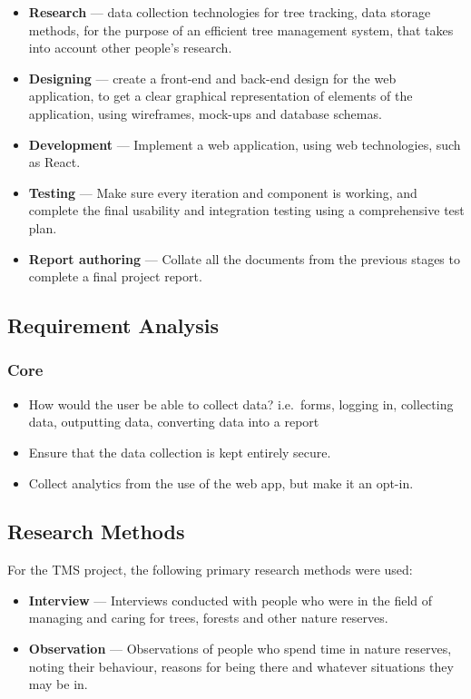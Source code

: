 \documentclass[12pt]{report}
\begin{document}
\begin{itemize}
    \item \textbf{Research} --- data collection technologies for tree tracking,
    data storage methods, for the purpose of an efficient tree management
    system, that takes into account other people's research.
    \item \textbf{Designing} --- create a front-end and back-end design for the
    web application, to get a clear graphical representation of elements of the
    application, using wireframes, mock-ups and database schemas. 
    \item \textbf{Development} --- Implement a web application, using web
    technologies, such as React.
    \item \textbf{Testing} --- Make sure every iteration and component is
    working, and complete the final usability and integration testing using a
    comprehensive test plan.
    \item \textbf{Report authoring} --- Collate all the documents from the
    previous stages to complete a final project report.
\end{itemize}

\subsection{Requirement Analysis}

\subsubsection{Core}

\begin{itemize}
    \item How would the user be able to collect data? i.e.\ forms, logging in,
    collecting data, outputting data, converting data into a report
    \item Ensure that the data collection is kept entirely secure.
    \item Collect analytics from the use of the web app, but make it an opt-in.
\end{itemize}

\subsection{Research Methods}

For the TMS project, the following primary research methods were used:

\begin{itemize}
    \item \textbf{Interview} --- Interviews conducted with people who were
    in the field of managing and caring for trees, forests and other nature
    reserves.
    \item \textbf{Observation} --- Observations of people who spend time in
    nature reserves, noting their behaviour, reasons for being there and
    whatever situations they may be in.
\end{itemize}
\end{document}
